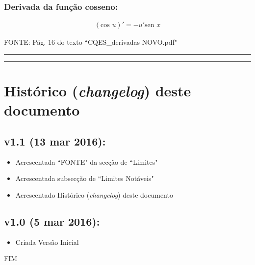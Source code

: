 \documentclass[portuguese,a4paper,12pt,onecolumn,fleqn]{article}
\newcommand{\myline}{\par
  \kern3pt %
  \hrule height 1.5pt
  \kern2pt %
  \hrule height 0.8pt
  \kern3pt %
}
\begin{document}
\subsubsection*{Derivada da função cosseno:}

\begin{gather*}
(\textrm{cos } u)' = -u' \textrm{sen } x
\end{gather*}

FONTE: Pág. 16 do texto ``CQES\_derivadas-NOVO.pdf"

\myline	%

\newpage %

\section*{Histórico (\textit{changelog}) deste documento}

\subsection*{v1.1 (13 mar 2016): }

\begin{itemize}
	\item Acrescentada ``FONTE" da secção de ``Limites" 
	\item Acrescentada subsecção de ``Limites Notáveis"
	\item Acrescentado Histórico (\textit{changelog}) deste documento
\end{itemize}

\subsection*{v1.0 (5 mar 2016): }
\begin{itemize}
	\item Criada Versão Inicial
\end{itemize}




\begin{center}
FIM
\end{center}
\end{document}
